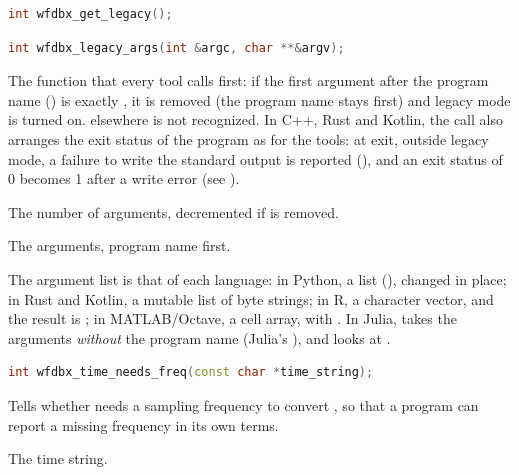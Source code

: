 \begin{lstlisting}[language=C++,style=signature]
int wfdbx_get_legacy();
\end{lstlisting}

\begin{lstlisting}[language=C++,style=signature]
int wfdbx_legacy_args(int &argc, char **&argv);
\end{lstlisting}
The function that every tool calls first: if the first argument after the
program name () is exactly , it is removed (the
program name stays first) and legacy mode is turned on. 
elsewhere is not recognized. In C++, Rust and Kotlin, the call also arranges
the exit status of the program as for the tools: at exit, outside legacy
mode, a failure to write the standard output is reported (), and an exit status of 0 becomes 1 after a
write error (see ).
\begin{params}
\item[argc] The number of arguments, decremented if  is
  removed.
\item[argv] The arguments, program name first.
\end{params}

The argument list is that of each language: in Python, a list
(), changed in place; in Rust and Kotlin, a mutable list of
byte strings; in R, a character vector, and the result is ; in MATLAB/Octave, a cell array, with . In Julia, 
takes the arguments \emph{without} the program name (Julia's ), and
looks at .

\begin{lstlisting}[language=C++,style=signature]
int wfdbx_time_needs_freq(const char *time_string);
\end{lstlisting}
Tells whether  needs a sampling frequency to convert
, so that a program can report a missing frequency in its
own terms.
\begin{params}
\item[time\_string] The time string.
\end{params}

